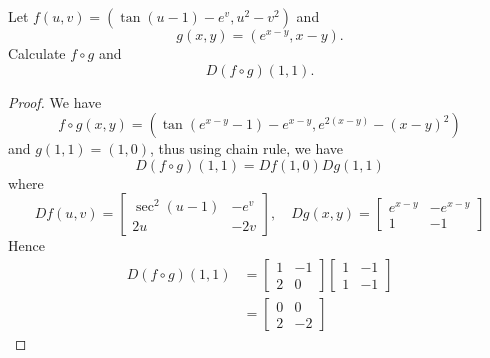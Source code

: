 \documentclass[openany]{book}
\begin{document}
\begin{prob}[2.5, Q7]
    Let \( f(u, v) = (\tan (u - 1) - e^v, u^2 - v^2) \) and  
   \[
   g(x, y) = (e^{x-y}, x - y).
   \]  
   Calculate \( f \circ g \) and  
   \[
   D(f \circ g)(1, 1).
   \]
\end{prob}
\begin{proof}
    We have 
    \begin{equation*}
        f\circ g(x,y)=(\tan(e^{x-y}-1)-e^{x-y}, e^{2(x-y)}-(x-y)^2)
    \end{equation*}
    and $g(1,1)=(1,0)$, thus using chain rule, we have 
    \begin{equation*}
        D(f\circ g)(1,1)=Df(1,0)Dg(1,1)
    \end{equation*}
    where 
    \begin{equation*}
        Df(u,v)=\begin{bmatrix}
            \sec^2(u-1)& -e^v\\
            2u&-2v
        \end{bmatrix}, \quad Dg(x,y)=\begin{bmatrix}
            e^{x-y}&-e^{x-y}\\
            1&-1
        \end{bmatrix}
    \end{equation*}
    Hence 
    \begin{align*}
        D(f\circ g)(1,1)&=\begin{bmatrix}
            1&-1\\
            2&0
        \end{bmatrix}\begin{bmatrix}
            1&-1\\
            1&-1
        \end{bmatrix}\\
        &=\begin{bmatrix}
            0&0\\
            2&-2
        \end{bmatrix}
    \end{align*}
\end{proof}
\end{document}
